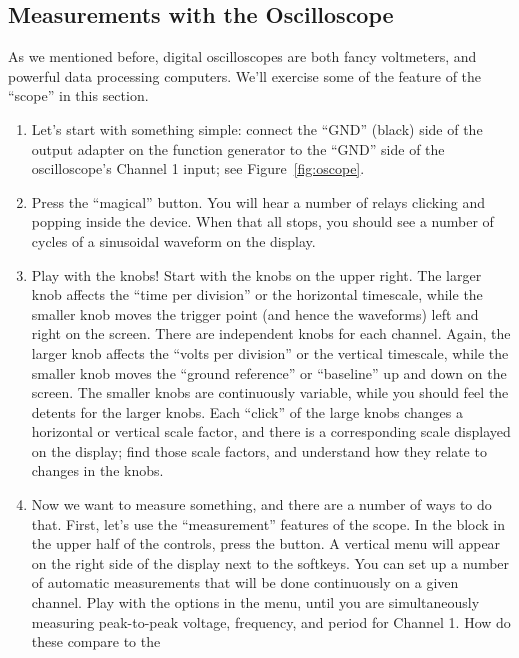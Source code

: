 \documentclass[12pt]{article}
\begin{document}
\subsection{Measurements with the Oscilloscope}
\label{sec:oscope}

As we mentioned before, digital oscilloscopes are both fancy
voltmeters, and powerful data processing computers.  We'll exercise
some of the feature of the ``scope'' in this section.

\begin{enumerate}
\item Let's start with something simple: connect the ``GND'' (black)
  side of the output adapter on the function generator to the ``GND''
  side of the oscilloscope's Channel 1 input; see
  Figure~\ref{fig:oscope}.
\item Press the ``magical''  button.  You will hear a
  number of relays clicking and popping inside the device.  When that
  all stops, you should see a number of cycles of a sinusoidal
  waveform on the display.
\item Play with the knobs!  Start with the  knobs on
  the upper right.  The larger knob affects the ``time per division''
  or the horizontal timescale, while the smaller knob moves the
  trigger point (and hence the waveforms) left and right on the
  screen.  There are independent  knobs for each
  channel.  Again, the larger knob affects the ``volts per division''
  or the vertical timescale, while the smaller knob moves the ``ground
  reference'' or ``baseline'' up and down on the screen.  The smaller
  knobs are continuously variable, while you should feel the detents
  for the larger knobs.  Each ``click'' of the large knobs changes a
  horizontal or vertical scale factor, and there is a corresponding
  scale displayed on the display; find those scale factors, and
  understand how they relate to changes in the knobs.
\item Now we want to measure something, and there are a number of ways
  to do that.  First, let's use the ``measurement'' features of the
  scope.  In the  block in the upper half of the
  controls, press the  button.  A vertical menu will
  appear on the right side of the display next to the softkeys.  You
  can set up a number of automatic measurements that will be done
  continuously on a given channel.  Play with the options in the menu,
  until you are simultaneously measuring peak-to-peak voltage,
  frequency, and period for Channel 1.  How do these compare to the

\end{enumerate}
\end{document}
